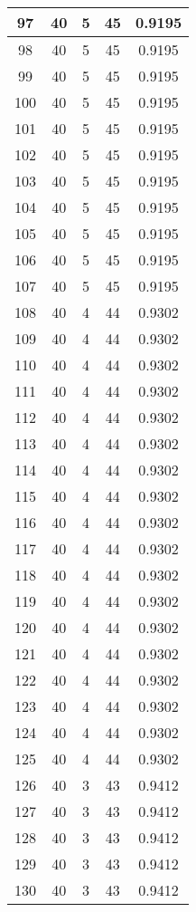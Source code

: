 \documentclass[letterpaper, 12pt]{article}
\begin{document}
\begin{longtable}{|c|c|c|c|c|}
\hline
97 & 40 & 5 & 45 & 0.9195 \\
\hline
98 & 40 & 5 & 45 & 0.9195 \\
\hline
99 & 40 & 5 & 45 & 0.9195 \\
\hline
100 & 40 & 5 & 45 & 0.9195 \\
\hline
101 & 40 & 5 & 45 & 0.9195 \\
\hline
102 & 40 & 5 & 45 & 0.9195 \\
\hline
103 & 40 & 5 & 45 & 0.9195 \\
\hline
104 & 40 & 5 & 45 & 0.9195 \\
\hline
105 & 40 & 5 & 45 & 0.9195 \\
\hline
106 & 40 & 5 & 45 & 0.9195 \\
\hline
107 & 40 & 5 & 45 & 0.9195 \\
\hline
108 & 40 & 4 & 44 & 0.9302 \\
\hline
109 & 40 & 4 & 44 & 0.9302 \\
\hline
110 & 40 & 4 & 44 & 0.9302 \\
\hline
111 & 40 & 4 & 44 & 0.9302 \\
\hline
112 & 40 & 4 & 44 & 0.9302 \\
\hline
113 & 40 & 4 & 44 & 0.9302 \\
\hline
114 & 40 & 4 & 44 & 0.9302 \\
\hline
115 & 40 & 4 & 44 & 0.9302 \\
\hline
116 & 40 & 4 & 44 & 0.9302 \\
\hline
117 & 40 & 4 & 44 & 0.9302 \\
\hline
118 & 40 & 4 & 44 & 0.9302 \\
\hline
119 & 40 & 4 & 44 & 0.9302 \\
\hline
120 & 40 & 4 & 44 & 0.9302 \\
\hline
121 & 40 & 4 & 44 & 0.9302 \\
\hline
122 & 40 & 4 & 44 & 0.9302 \\
\hline
123 & 40 & 4 & 44 & 0.9302 \\
\hline
124 & 40 & 4 & 44 & 0.9302 \\
\hline
125 & 40 & 4 & 44 & 0.9302 \\
\hline
126 & 40 & 3 & 43 & 0.9412 \\
\hline
127 & 40 & 3 & 43 & 0.9412 \\
\hline
128 & 40 & 3 & 43 & 0.9412 \\
\hline
129 & 40 & 3 & 43 & 0.9412 \\
\hline
130 & 40 & 3 & 43 & 0.9412 \\

\end{longtable}
\end{document}
